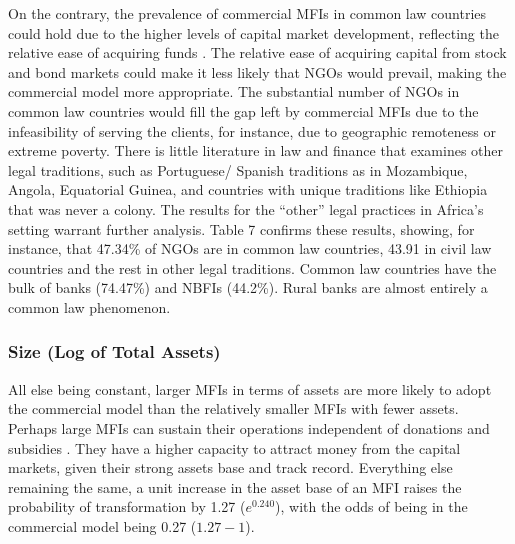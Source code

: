 \documentclass[a4paper, nobind]{templates/ociamthesis}
\begin{document}
On the contrary, the prevalence of commercial MFIs in common law countries could hold due to the higher levels of capital market development, reflecting the relative ease of acquiring funds \autocite{schnyder2018twenty}. The relative ease of acquiring capital from stock and bond markets could make it less likely that NGOs would prevail, making the commercial model more appropriate. The substantial number of NGOs in common law countries would fill the gap left by commercial MFIs due to the infeasibility of serving the clients, for instance, due to geographic remoteness or extreme poverty. There is little literature in law and finance that examines other legal traditions, such as Portuguese/ Spanish traditions as in Mozambique, Angola, Equatorial Guinea, and countries with unique traditions like Ethiopia that was never a colony. The results for the ``other'' legal practices in Africa's setting warrant further analysis. Table 7 confirms these results, showing, for instance, that 47.34\% of NGOs are in common law countries, 43.91 in civil law countries and the rest in other legal traditions. Common law countries have the bulk of banks (74.47\%) and NBFIs (44.2\%). Rural banks are almost entirely a common law phenomenon.

\hypertarget{size-log-of-total-assets}{%
\subsubsection{Size (Log of Total Assets)}\label{size-log-of-total-assets}}

All else being constant, larger MFIs in terms of assets are more likely to adopt the commercial model than the relatively smaller MFIs with fewer assets. Perhaps large MFIs can sustain their operations independent of donations and subsidies \autocite{d2013unsubsidized}. They have a higher capacity to attract money from the capital markets, given their strong assets base and track record. Everything else remaining the same, a unit increase in the asset base of an MFI raises the probability of transformation by 1.27 (\(e^{0.240}\)), with the odds of being in the commercial model being 0.27 (\(1.27 - 1\)).
\end{document}
